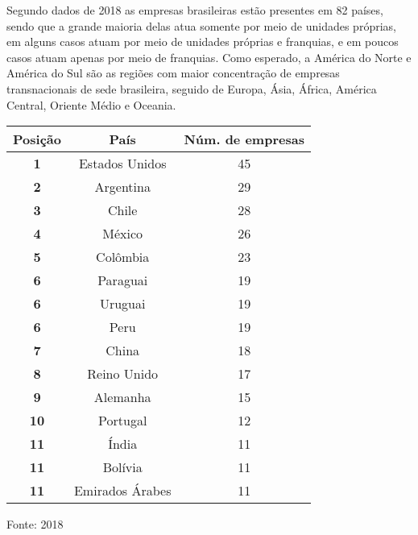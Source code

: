 Segundo dados de 2018 as empresas brasileiras estão presentes em 82
países, sendo que a grande maioria delas atua somente por meio de
unidades próprias, em alguns casos atuam por meio de unidades próprias e
franquias, e em poucos casos atuam apenas por meio de franquias. Como
esperado, a América do Norte e América do Sul são as regiões com maior
concentração de empresas transnacionais de sede brasileira, seguido de
Europa, Ásia, África, América Central, Oriente Médio e Oceania.

\pagebreak

\begin{center}
\end{center}

\begin{center}
\begin{tabular}{|c|c|c|}
\hline
\textbf{Posição} & \textbf{País} & \textbf{Núm. de empresas} \\ \hline
\textbf{1} & Estados Unidos & 45 \\ \hline
\textbf{2} & Argentina & 29 \\ \hline
\textbf{3} & Chile & 28 \\ \hline
\textbf{4} & México & 26 \\ \hline
\textbf{5} & Colômbia & 23 \\ \hline
\textbf{6} & Paraguai & 19 \\ \hline
\textbf{6} & Uruguai & 19 \\ \hline
\textbf{6} & Peru & 19 \\ \hline
\textbf{7} & China & 18 \\ \hline
\textbf{8} & Reino Unido & 17 \\ \hline
\textbf{9} & Alemanha & 15 \\ \hline
\textbf{10} & Portugal & 12 \\ \hline
\textbf{11} & Índia & 11 \\ \hline
\textbf{11} & Bolívia & 11 \\ \hline
\textbf{11} & Emirados Árabes & 11 \\ \hline
\end{tabular}
\end{center}

\begin{center}
{\scriptsize{Fonte:  2018}}
\end{center}

\medskip

